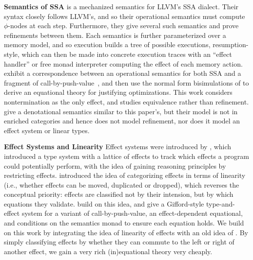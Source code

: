 \documentclass[acmsmall,screen,anonymous,review]{acmart}
\begin{document}
\noindent \textbf{Semantics of SSA} \citet{vellvm-12} is a mechanized semantics for LLVM's SSA dialect.
Their syntax closely follows LLVM's, and so their operational semantics must compute
$\phi$-nodes at each step. Furthermore, they give several such semantics and
prove refinements between them. Each semantics is further parameterized
over a memory model, and so execution builds a tree of possible executions, resumption-style,
which can then be made into concrete execution traces with an ``effect handler'' or
free monad interpreter computing the effect of each memory action. 
\citet{garbuzov-structural-cfg-2018} exhibit a correspondence between
an operational semantics for both SSA and a fragment of
call-by-push-value~\cite{cbpv}, and then use the normal form
bisimulations of \citet{lassen-bisim} to derive an equational theory
for justifying optimizations.  This work considers nontermination as
the only effect, and studies equivalence rather than refinement.
\citet{ghalayini-24-ssa-densem-arxiv} give a denotational semantics
similar to this paper's, but their model is not in enriched categories and
hence does not model refinement, nor does it model an effect system or
linear types. 

\noindent \textbf{Effect Systems and Linearity} Effect systems were introduced by \citet{gifford86},
which introduced a type system with a lattice of effects to track which effects a program could
potentially perform, with the idea of gaining reasoning principles by restricting effects.
\citet{fuhrmann-direct-1999} introduced the idea of categorizing effects in terms of linearity
(i.e., whether effects can be moved, duplicated or dropped), which reverses the conceptual priority:
effects are classified not by their intension, but by which equations they validate.
\citet{kammar-effect-12} build on this idea, and give a Gifford-style type-and-effect system for a
variant of call-by-push-value, an effect-dependent equational, and conditions on the semantics monad
to ensure each equation holds.
%
%
We build on this work by integrating the idea of linearity of effects with an old idea of
\citet{lipton-mover-75}. By simply classifying effects by whether they can commute to the left or
right of another effect, we gain a very rich (in)equational theory very cheaply. 
\end{document}
